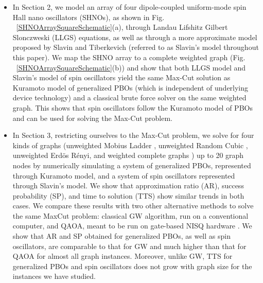 \documentclass[10pt]{article}
\begin{document}
\begin{itemize}
    \item In Section 2, we model an array of four dipole-coupled uniform-mode spin Hall nano oscillators (SHNOs), as shown in Fig. ~\ref{SHNOArraySquareSchematic}(a), through Landau Lifshitz Gilbert Slonczweski (LLGS) equations, as well as through a more approximate model proposed by Slavin and Tiberkevich \cite{Slavin} (referred to as Slavin's model throughout this paper). We map the SHNO array to a complete weighted graph (Fig. ~\ref{SHNOArraySquareSchematic}(b)) \cite{Ref_CompleteGraph} and show that both LLGS model and Slavin's model of spin oscillators yield the same Max-Cut solution as Kuramoto model of generalized PBOs (which is independent of underlying device technology) and a classical brute force solver on the same weighted graph. This shows that spin oscillators follow the Kuramoto model of PBOs and can be used for solving the Max-Cut problem.

    \item In Section 3, restricting ourselves to the Max-Cut problem, 
    we solve for four kinds of graphs (unweighted Mobius Ladder \cite{Ref_MobiusLadder}, unweighted Random Cubic \cite{Ref_RandomCubic}, unweighted Erd{\"o}s R{\'e}nyi\cite{Ref_ErdosRenyi}, and weighted complete graphs \cite{Ref_CompleteGraph}) up to 20 graph nodes by numerically simulating a system of generalized PBOs, represented through Kuramoto model, and a system of spin oscillators represented through Slavin's model. We show that approximation ratio (AR), success probability (SP), and time to solution (TTS) show similar trends in both cases. We compare these results with two other alternative methods to solve the same MaxCut problem: classical GW algorithm, run on a conventional computer, and QAOA, meant to be run on gate-based NISQ hardware \cite{NISQReview,QAOA_Farhi}. We show that AR and SP obtained for generalized PBOs, as well as spin oscillators, are comparable to that for GW and much higher than that for QAOA for almost all graph instances. Moreover, unlike GW, TTS for generalized PBOs and spin oscillators does not grow with graph size for the instances we have studied.
\end{itemize}
\end{document}
